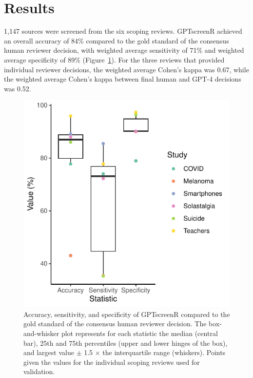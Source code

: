 \documentclass[10pt,a4paper,twocolumn]{article}
\begin{document}
\section{Results}

1,147 sources were screened from the six scoping reviews. GPTscreenR achieved an overall accuracy of 84\% compared to the gold standard of the consensus human reviewer decision, with weighted average sensitivity of 71\% and weighted average specificity of 89\% (Figure~\ref{fig:statistics}). For the three reviews that provided individual reviewer decisions, the weighted average Cohen's kappa was 0.67, while the weighted average Cohen's kappa between final human and GPT-4 decisions was 0.52.

\begin{figure}
\centering
  \includegraphics[width=\columnwidth]{./fig_4.pdf}
\caption{Accuracy, sensitivity, and specificity of GPTscreenR compared to the gold standard of the consensus human reviewer decision. The box-and-whisker plot represents for each statistic the median (central bar), 25th and 75th percentiles (upper and lower hinges of the box), and largest value \(\pm\) 1.5 \(\times\) the interquartile range (whiskers). Points given the values for the individual scoping reviews used for validation.}
  \label{fig:statistics}
\end{figure}
\end{document}
